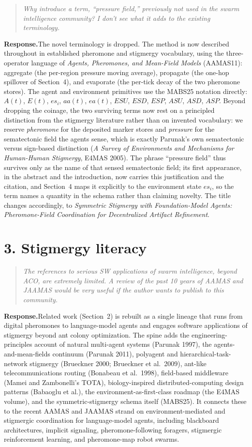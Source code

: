 \documentclass[11pt]{article}
\newcommand{\quoted}[1]{\begin{quote}\itshape #1\end{quote}}
\newcommand{\response}{\par\smallskip\noindent\textbf{Response.}\space}
\begin{document}
\quoted{Why introduce a term, ``pressure field,'' previously not used in the swarm intelligence community? I don't see what it adds to the existing terminology.}

\response The novel terminology is dropped. The method is now described throughout in established pheromone and stigmergy vocabulary, using the three-operator language of \emph{Agents, Pheromones, and Mean-Field Models} (AAMAS11): aggregate (the per-region pressure moving average), propagate (the one-hop spillover of Section~4), and evaporate (the per-tick decay of the two pheromone stores). The agent and environment primitives use the MABS25 notation directly: $A(t)$, $E(t)$, $es_i$, $aa(t)$, $ea(t)$, $ESU$, $ESD$, $ESP$, $ASU$, $ASD$, $ASP$. Beyond dropping the coinage, the two surviving terms now rest on a principled distinction from the stigmergy literature rather than on invented vocabulary: we reserve \emph{pheromone} for the deposited marker stores and \emph{pressure} for the sematectonic field the agents sense, which is exactly Parunak's own sematectonic versus sign-based distinction (\emph{A Survey of Environments and Mechanisms for Human-Human Stigmergy}, E4MAS 2005). The phrase ``pressure field'' thus survives only as the name of that sensed sematectonic field; its first appearance, in the abstract and the introduction, now carries this justification and the citation, and Section~4 maps it explicitly to the environment state $es_i$, so the term names a quantity in the schema rather than claiming novelty. The title changes accordingly, to \emph{Symmetric Stigmergy with Foundation-Model Agents: Pheromone-Field Coordination for Decentralized Artifact Refinement}.

\section*{3. Stigmergy literacy}

\quoted{The references to serious SW applications of swarm intelligence, beyond ACO, are extremely limited. A review of the past 10 years of AAMAS and JAAMAS would be very useful if the author wants to publish to this community.}

\response Related work (Section~2) is rebuilt as a single lineage that runs from digital pheromones to language-model agents and engages software applications of stigmergy beyond ant colony optimization. The spine adds the engineering-principles account of natural multi-agent systems (Parunak 1997), the agents-and-mean-fields continuum (Parunak 2011), polyagent and hierarchical-task-network stigmergy (Brueckner 2000; Brueckner et al.\ 2009), ant-like telecommunications routing (Bonabeau et al.\ 1998), field-based middleware (Mamei and Zambonelli's TOTA), biology-inspired distributed-computing design patterns (Babaoglu et al.), the environment-as-first-class roadmap (the E4MAS volume), and the symmetric-stigmergy schema itself (MABS25). It connects these to the recent AAMAS and JAAMAS strand on environment-mediated and stigmergic coordination for language-model agents, including blackboard architectures, implicit signaling, pheromone-following foragers, stigmergic reinforcement learning, and pheromone-map robot swarms.
\end{document}
